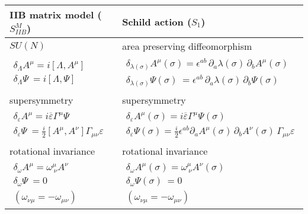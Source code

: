 \documentclass[12pt,a4paper]{article}
\begin{document}
\begin{table}
\begin{center}
\begin{tabular}{l|l}
IIB matrix model ($S^M_{IIB}$) & Schild action ($S_1$)\\ \hline
$SU(N)$ & area preserving diffeomorphism  \\
$\begin{array}{l}
 \delta_\Lambda A^\mu=i[\Lambda,A^\mu]\\
 \delta_\Lambda \Psi~=i[\Lambda,\Psi]
 \end{array}$
	&$ \begin{array}{l}
	 \delta_{\lambda(\sigma)}A^\mu(\sigma)
	  =\epsilon^{ab}\,\partial_a\lambda(\sigma)\,\partial_b
	A^\mu(\sigma)\\
	 \delta_{\lambda(\sigma)}\Psi(\sigma)~
	  =\epsilon^{ab}\,\partial_a\lambda(\sigma)\,\partial_b
	\Psi(\sigma)
	 \end{array}$\\ \hline
supersymmetry & supersymmetry\\
$ \begin{array}{l}
 \delta_\varepsilon A^\mu=i {\overline\varepsilon}\Gamma^\mu\Psi\\
 \delta_\varepsilon \Psi~=
 \frac{i}{2}[A^\mu,A^\nu]\Gamma_{\mu\nu}\varepsilon
 \end{array}$
	&$ \begin{array}{l}
	 \delta_\varepsilon A^\mu(\sigma)
	  = i {\overline\varepsilon}\Gamma^\mu\Psi(\sigma)\\
	 \delta_\varepsilon \Psi(\sigma)
	  =\frac{i}{2}\epsilon^{ab}\partial_a
	  A^\mu(\sigma)\,\partial_b A^\nu(\sigma)\,
	   \Gamma_{\mu\nu}\varepsilon\label{eqn:SUSY}
	 \end{array}$ \\ \hline
rotational invariance & rotational invariance \\
$\begin{array}{l}
 \delta_\omega A^\mu=\omega^\mu_{~\nu}A^\nu\\
 \delta_\omega \Psi~=0\\
 (\omega_{\nu\mu}=-\omega_{\mu\nu})
 \end{array}$
	&$\begin{array}{l}
	 \delta_\omega A^\mu(\sigma)=\omega^\mu_{~\nu}A^\nu(\sigma)\\
	 \delta_\omega \Psi(\sigma)~=0\\
	 (\omega_{\nu\mu}=-\omega_{\mu\nu})
	\end{array}$\\ \hline

\end{tabular}
\end{center}
\end{table}
\end{document}
